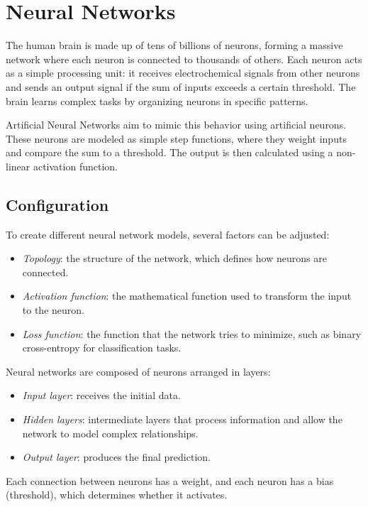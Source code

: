 \section{Neural Networks}

The human brain is made up of tens of billions of neurons, forming a massive network where each neuron is connected to thousands of others. 
Each neuron acts as a simple processing unit: it receives electrochemical signals from other neurons and sends an output signal if the sum of inputs exceeds a certain threshold. 
The brain learns complex tasks by organizing neurons in specific patterns.

Artificial Neural Networks aim to mimic this behavior using artificial neurons. 
These neurons are modeled as simple step functions, where they weight inputs and compare the sum to a threshold. 
The output is then calculated using a non-linear activation function.

\subsection{Configuration}
To create different neural network models, several factors can be adjusted:
\begin{itemize}
    \item \textit{Topology}: the structure of the network, which defines how neurons are connected.
    \item \textit{Activation function}: the mathematical function used to transform the input to the neuron.
    \item \textit{Loss function}: the function that the network tries to minimize, such as binary cross-entropy for classification tasks.
\end{itemize}
\noindent Neural networks are composed of neurons arranged in layers:
\begin{itemize}
    \item \textit{Input layer}: receives the initial data.
    \item \textit{Hidden layers}: intermediate layers that process information and allow the network to model complex relationships.
    \item \textit{Output layer}: produces the final prediction.
\end{itemize}
\noindent Each connection between neurons has a weight, and each neuron has a bias (threshold), which determines whether it activates.

